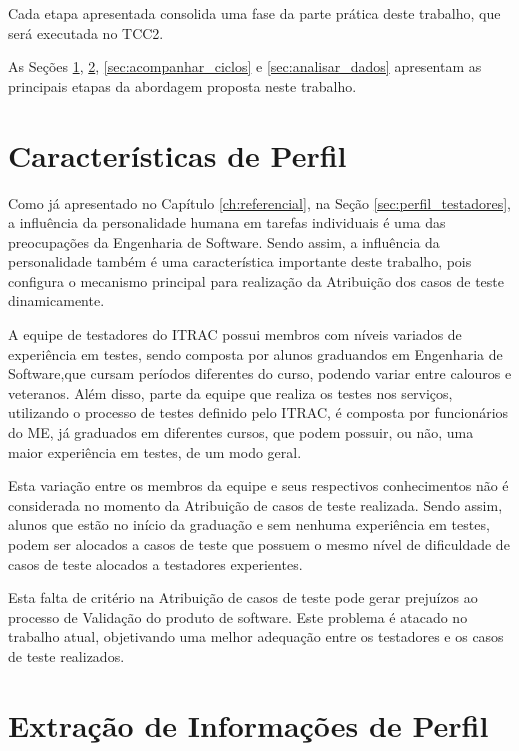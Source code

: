 Cada etapa apresentada consolida uma fase da parte prática deste trabalho, que será executada no TCC2.

As Seções \ref{sec:caracteristicas_importantes}, \ref{sec:extrair_caracteristicas}, \ref{sec:acompanhar_ciclos} e \ref{sec:analisar_dados} apresentam as principais etapas da abordagem proposta neste trabalho.

\section{Características de Perfil}
\label{sec:caracteristicas_importantes}

Como já apresentado no Capítulo \ref{ch:referencial}, na Seção \ref{sec:perfil_testadores}, a influência da personalidade humana em tarefas individuais é uma das preocupações da Engenharia de Software.  Sendo assim, a influência da personalidade também é uma característica importante deste trabalho, pois configura o mecanismo principal para realização da Atribuição dos casos de teste dinamicamente.

A equipe de testadores do ITRAC possui membros com níveis variados de experiência em testes, sendo composta por alunos graduandos em Engenharia de Software,que cursam períodos diferentes do curso, podendo variar entre calouros e veteranos.  Além disso, parte da equipe que realiza os testes nos serviços, utilizando o processo de testes definido pelo ITRAC, é composta por funcionários do ME, já graduados em diferentes cursos, que podem possuir, ou não, uma maior experiência em testes, de um modo geral.

Esta variação entre os membros da equipe e seus respectivos conhecimentos não é considerada no momento da Atribuição de casos de teste realizada.  Sendo assim, alunos que estão no início da graduação e sem nenhuma experiência em testes, podem ser alocados a casos de teste que possuem o mesmo nível de dificuldade de casos de teste alocados a testadores experientes.

Esta falta de critério na Atribuição de casos de teste pode gerar prejuízos ao processo de Validação do produto de software. Este problema é atacado no trabalho atual, objetivando uma melhor adequação entre os testadores e os casos de teste realizados.

\section{Extração de Informações de Perfil}
\label{sec:extrair_caracteristicas}


